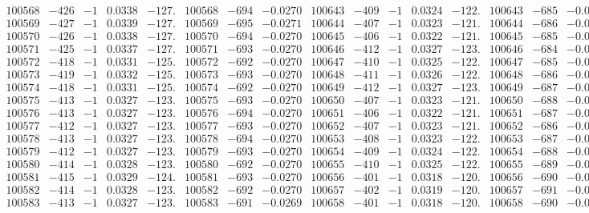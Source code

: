 \documentclass[11pt,reqno,a4letter]{article}
\numberwithin{figure}{section}
\numberwithin{table}{section}
\theoremstyle{plain}
\numberwithin{theorem}{section}
\theoremstyle{definition}
\begin{document}
\begin{table}[ht!]
\begin{equation*}
{\begin{array}{ccccc|ccc||ccccc|ccc}
100568 & -426 & -1 & 0.0338 & -127. & 100568 & -694 & -0.0270 & 100643 & -409 & -1 & 0.0324 & -122. & 100643 & -685 & -0.0267  \\
100569 & -427 & -1 & 0.0339 & -127. & 100569 & -695 & -0.0271 & 100644 & -407 & -1 & 0.0323 & -121. & 100644 & -686 & -0.0267  \\
100570 & -426 & -1 & 0.0338 & -127. & 100570 & -694 & -0.0270 & 100645 & -406 & -1 & 0.0322 & -121. & 100645 & -685 & -0.0267  \\
100571 & -425 & -1 & 0.0337 & -127. & 100571 & -693 & -0.0270 & 100646 & -412 & -1 & 0.0327 & -123. & 100646 & -684 & -0.0266  \\
100572 & -418 & -1 & 0.0331 & -125. & 100572 & -692 & -0.0270 & 100647 & -410 & -1 & 0.0325 & -122. & 100647 & -685 & -0.0267  \\
100573 & -419 & -1 & 0.0332 & -125. & 100573 & -693 & -0.0270 & 100648 & -411 & -1 & 0.0326 & -122. & 100648 & -686 & -0.0267  \\
100574 & -418 & -1 & 0.0331 & -125. & 100574 & -692 & -0.0270 & 100649 & -412 & -1 & 0.0327 & -123. & 100649 & -687 & -0.0267  \\
100575 & -413 & -1 & 0.0327 & -123. & 100575 & -693 & -0.0270 & 100650 & -407 & -1 & 0.0323 & -121. & 100650 & -688 & -0.0268  \\
100576 & -413 & -1 & 0.0327 & -123. & 100576 & -694 & -0.0270 & 100651 & -406 & -1 & 0.0322 & -121. & 100651 & -687 & -0.0267  \\
100577 & -412 & -1 & 0.0327 & -123. & 100577 & -693 & -0.0270 & 100652 & -407 & -1 & 0.0323 & -121. & 100652 & -686 & -0.0267  \\
100578 & -413 & -1 & 0.0327 & -123. & 100578 & -694 & -0.0270 & 100653 & -408 & -1 & 0.0323 & -122. & 100653 & -687 & -0.0267  \\
100579 & -412 & -1 & 0.0327 & -123. & 100579 & -693 & -0.0270 & 100654 & -409 & -1 & 0.0324 & -122. & 100654 & -688 & -0.0268  \\
100580 & -414 & -1 & 0.0328 & -123. & 100580 & -692 & -0.0270 & 100655 & -410 & -1 & 0.0325 & -122. & 100655 & -689 & -0.0268  \\
100581 & -415 & -1 & 0.0329 & -124. & 100581 & -693 & -0.0270 & 100656 & -401 & -1 & 0.0318 & -120. & 100656 & -690 & -0.0269  \\
100582 & -414 & -1 & 0.0328 & -123. & 100582 & -692 & -0.0270 & 100657 & -402 & -1 & 0.0319 & -120. & 100657 & -691 & -0.0269  \\
100583 & -413 & -1 & 0.0327 & -123. & 100583 & -691 & -0.0269 & 100658 & -401 & -1 & 0.0318 & -120. & 100658 & -690 & -0.0269  \\

\end{array}}
\end{equation*}
\end{table}
\end{document}

